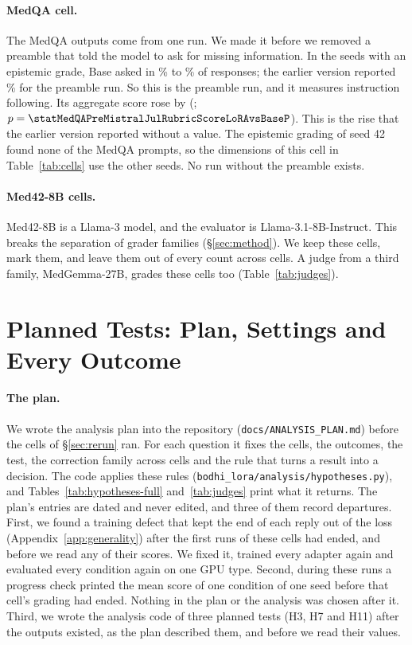 \documentclass{article}
\begin{document}
\paragraph{MedQA cell.} The MedQA outputs come from one run. We made it before we removed a
preamble that told the model to ask for missing information. In the
\statMedQAPreMistralJulSeedsGraded{} seeds with an epistemic grade, Base asked in
\statMedQAPreMistralJulActiveInquiryBaseSeedMin\% to \statMedQAPreMistralJulActiveInquiryBaseSeedMax\% of
responses; the earlier version reported \statPostedMedQAPreambleAI\% for the preamble run. So this is the preamble run,
and it measures instruction following. Its aggregate score rose by
\statMedQAPreMistralJulRubricScoreLoRAvsBaseDiff{} (\statMedQAPreMistralJulRubricScoreLoRAvsBaseCI; $p =
\statMedQAPreMistralJulRubricScoreLoRAvsBaseP$). This is the rise that the earlier version reported without a
value. The epistemic grading of seed 42 found none of the MedQA prompts, so the dimensions of this
cell in Table~\ref{tab:cells} use the other \statMedQAPreMistralJulSeedsGraded{} seeds. No run
without the preamble exists.

\paragraph{Med42-8B cells.} Med42-8B is a Llama-3 model, and the evaluator is
Llama-3.1-8B-Instruct. This breaks the separation of grader families (\S\ref{sec:method}). We keep
these cells, mark them, and leave them out of every count across cells. A judge from a third
family, MedGemma-27B, grades these cells too (Table~\ref{tab:judges}).

\section{Planned Tests: Plan, Settings and Every Outcome}
\label{app:rerun}

\paragraph{The plan.} We wrote the analysis plan into the repository
(\texttt{docs/ANALYSIS\_PLAN.md}) before the cells of \S\ref{sec:rerun} ran. For each question it
fixes the cells, the outcomes, the test, the correction family across cells and the rule that turns
a result into a decision. The code applies these rules (\texttt{bodhi\_lora/analysis/hypotheses.py}),
and Tables~\ref{tab:hypotheses-full} and~\ref{tab:judges} print what it returns. The plan's entries
are dated and never edited, and three of them record departures. First, we found a training defect
that kept the end of each reply out of the loss (Appendix~\ref{app:generality}) after the first
runs of these cells had ended, and before we read any of their scores. We fixed it, trained every
adapter again and evaluated every condition again on one GPU type. Second, during these runs a
progress check printed the mean score of one condition of one seed before that cell's grading had
ended. Nothing in the plan or the analysis was chosen after it. Third, we wrote the analysis code
of three planned tests (H3, H7 and H11) after the outputs existed, as the plan described them,
and before we read their values.
\end{document}
